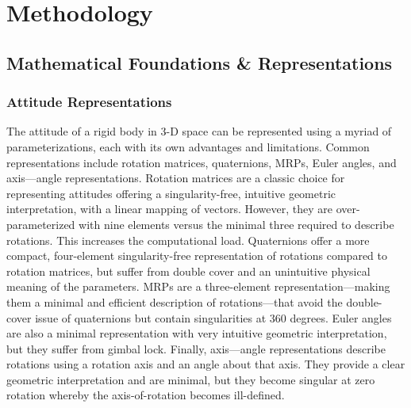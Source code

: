 \chapter{Methodology}
\label{sec:methodology}


\section{Mathematical Foundations \& Representations}
\label{sec:methodology-foundations}

\subsection{Attitude Representations}
\label{sec:attitude-representations}
The attitude of a rigid body in \ac{3-D} space can be represented using a myriad of parameterizations, each with its own advantages and limitations. 
Common representations include rotation matrices, quaternions, \ac{MRP}s, Euler angles, and axis---angle representations.
Rotation matrices are a classic choice for representing attitudes offering a singularity-free, intuitive geometric interpretation, with a linear mapping of vectors. 
However, they are over-parameterized with nine elements versus the minimal three required to describe rotations. 
This increases the computational load. 
Quaternions offer a more compact, four-element singularity-free representation of rotations compared to rotation matrices, but suffer from double cover and an unintuitive physical meaning of the parameters.
\ac{MRP}s are a three-element representation---making them a minimal and efficient description of rotations---that avoid the double-cover issue of quaternions but contain singularities at 360 degrees.
Euler angles are also a minimal representation with very intuitive geometric interpretation, but they suffer from gimbal lock.
Finally, axis---angle representations describe rotations using a rotation axis and an angle about that axis. 
They provide a clear geometric interpretation and are minimal, but they become singular at zero rotation whereby the axis-of-rotation becomes ill-defined.

